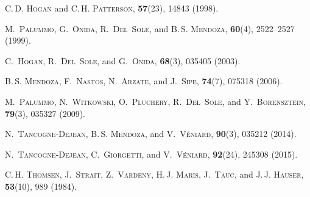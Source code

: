 \documentclass[pss]{wiley2sp} %
\begin{document}
\begin{thebibliography}{[10]}

 \textsc{C.\,D. Hogan} and  \textsc{C.\,H. Patterson},
  \textbf{57}(23), 14843 (1998).


 \textsc{M.~Palummo},  \textsc{G.~Onida},  \textsc{R.~Del~Sole},  and
  \textsc{B.\,S. Mendoza},
  \textbf{60}(4), 2522--2527 (1999).


 \textsc{C.~Hogan},  \textsc{R.~Del~Sole},  and  \textsc{G.~Onida},
  \textbf{68}(3), 035405 (2003).


 \textsc{B.\,S. Mendoza},  \textsc{F.~Nastos},  \textsc{N.~Arzate},  and
  \textsc{J.~Sipe},
  \textbf{74}(7), 075318 (2006).


 \textsc{M.~Palummo},  \textsc{N.~Witkowski},  \textsc{O.~Pluchery},
  \textsc{R.~Del~Sole},  and  \textsc{Y.~Borensztein},
  \textbf{79}(3), 035327 (2009).


 \textsc{N.~Tancogne-Dejean},  \textsc{B.\,S. Mendoza},  and
  \textsc{V.~V{\'e}niard},
  \textbf{90}(3), 035212 (2014).


 \textsc{N.~Tancogne-Dejean},  \textsc{C.~Giorgetti},  and
  \textsc{V.~V{\'e}niard},
  \textbf{92}(24), 245308 (2015).


 \textsc{C.\,H. Thomsen},  \textsc{J.~Strait},  \textsc{Z.~Vardeny},
  \textsc{H.\,J. Maris},  \textsc{J.~Tauc},  and  \textsc{J.\,J.
  Hauser},
  \textbf{53}(10), 989 (1984).



\end{thebibliography}
\end{document}
